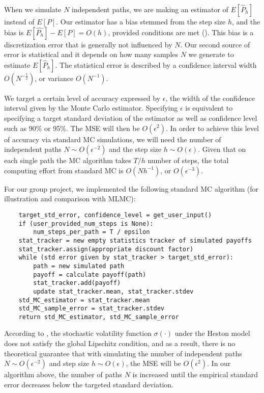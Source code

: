 \documentclass{article}
\begin{document}
	When we simulate $N$ independent paths, we are making an estimator of $E[\widehat{P}_h]$ instead of $E[P]$. Our estimator has a bias stemmed from the step size $h$, and the bias is $E[\widehat{P_h}] - E[P] = O(h)$, provided conditions are met (\cite{higham15}). This bias is a discretization error that is generally not influenced by $N$. Our second source of error is statistical and it depends on how many samples $N$ we generate to estimate $E[\widehat{P}_h]$. The statistical error is described by a confidence interval width $O(N^{-\frac{1}{2}})$, or variance $O(N^{-1})$.
	
    We target a certain level of accuracy expressed by $\epsilon$, the width of the confidence interval given by the Monte Carlo estimator. Specifying $\epsilon$ is equivalent to specifying a target standard deviation of the estimator as well as confidence level such as 90\% or 95\%. The MSE will then be $O(\epsilon^2)$. In order to achieve this level of accuracy via standard MC simulations, we will need the number of independent paths $N \sim O(\epsilon^{-2})$ and the step size $h \sim O(\epsilon)$. Given that on each single path the MC algorithm takes $T/h$ number of steps, the total computing effort from standard MC is $O(Nh^{-1})$, or $O(\epsilon^{-3})$. 
    
    For our group project, we implemented the following standard MC algorithm (for illustration and comparison with MLMC):
    \begin{lstlisting}
	target_std_error, confidence_level = get_user_input()
    if (user_provided_num_steps is None):
        num_steps_per_path = T / epsilon
    stat_tracker = new empty statistics tracker of simulated payoffs
    stat_tracker.assign(appropriate discount factor)
    while (std error given by stat_tracker > target_std_error):
        path = new simulated path
        payoff = calculate payoff(path)
        stat_tracker.add(payoff)
        update stat_tracker.mean, stat_tracker.stdev
    std_MC_estimator = stat_tracker.mean
    std_MC_sample_error = stat_tracker.stdev
    return std_MC_estimator, std_MC_sample_error
    \end{lstlisting}
    
    According to \cite{giles08}, the stochastic volatility function $\sigma(\cdot)$ under the Heston model does not satisfy the global Lipschitz condition, and as a result, there is no theoretical guarantee that with simulating the number of independent paths $N \sim O(\epsilon^{-2})$ and step size $h \sim O(\epsilon)$, the MSE will be $O(\epsilon^2)$. In our algorithm above, the number of paths $N$ is increased until the empirical standard error decreases below the targeted standard deviation. 
    
\end{document}
